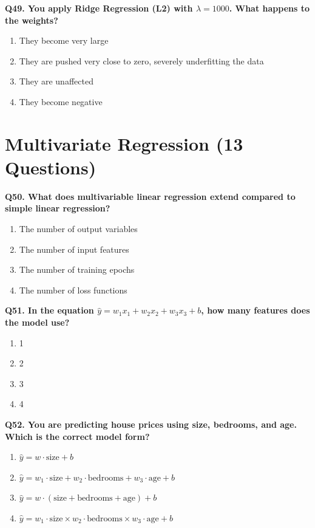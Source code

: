 \documentclass[12pt, a4paper]{article}
\newcommand{\question}[1]{\vspace{0.6em}\noindent\textbf{#1}}
\begin{document}
\question{Q49. You apply Ridge Regression (L2) with $\lambda=1000$. What happens to the weights?}
\begin{enumerate}[label=\alph*)]
    \item They become very large
    \item They are pushed very close to zero, severely underfitting the data
    \item They are unaffected
    \item They become negative
\end{enumerate}

\section{Multivariate Regression (13 Questions)}

\question{Q50. What does multivariable linear regression extend compared to simple linear regression?}
\begin{enumerate}[label=\alph*)]
    \item The number of output variables
    \item The number of input features
    \item The number of training epochs
    \item The number of loss functions
\end{enumerate}

\question{Q51. In the equation $\hat{y} = w_1x_1 + w_2x_2 + w_3x_3 + b$, how many features does the model use?}
\begin{enumerate}[label=\alph*)]
    \item 1
    \item 2
    \item 3
    \item 4
\end{enumerate}

\question{Q52. You are predicting house prices using size, bedrooms, and age. Which is the correct model form?}
\begin{enumerate}[label=\alph*)]
    \item $\hat{y} = w \cdot \text{size} + b$
    \item $\hat{y} = w_1 \cdot \text{size} + w_2 \cdot \text{bedrooms} + w_3 \cdot \text{age} + b$
    \item $\hat{y} = w \cdot (\text{size} + \text{bedrooms} + \text{age}) + b$
    \item $\hat{y} = w_1 \cdot \text{size} \times w_2 \cdot \text{bedrooms} \times w_3 \cdot \text{age} + b$
\end{enumerate}
\end{document}
